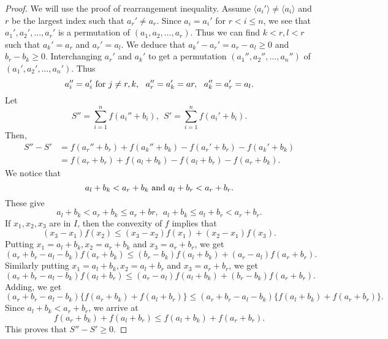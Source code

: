 \begin{proof}
  We will use the proof of rearrangement inequality. Assume $\langle a_i'\rangle \neq\langle a_i\rangle$ and $r$ be the largest
  index such that $a_r'\neq a_r$. Since $a_i=a_i'$ for $r<i\leq n$, we see that $a_1', a_2', \ldots, a_r'$ is a permutation of
  $(a_1, a_2, \ldots, a_r)$. Thus we can find $k<r, l<r$ such that $a_k' = a_r$ and $a_r' = a_l$. We deduce that $a_k' - a_r' = a_r
  - a_l\geq 0$ and $b_r - b_k\geq 0$. Interchanging $a_r'$ and $a_k'$ to get a permutation $(a_1'', a_2'', \ldots, a_n'')$ of $(a_1',
  a_2', \ldots, a_n')$. Thus
  $$a_i''= a_i'\text{~{\rm{for}}~} j\neq r,k,~~a_r''=a_k'=ar,~~a_k''=a_r'=a_l.$$
  Let $$S'' = \sum_{i=1}^nf(a_i'' + b_i),~~S' = \sum_{i=1}^nf(a_i' + b_i).$$
  Then, $$\begin{aligned}S'' - S' & = f(a_r'' + b_r) + f(a_k'' + b_k) - f(a_r' + b_r) - f(a_k' + b_k)\\& = f(a_r + b_r) + f(a_l +
    b_k) - f(a_l + b_r) - f(a_r + b_k).\end{aligned}$$
  We notice that $$a_l + b_k<a_r + b_k\text{~{\rm{and}}~}a_l + b_r < a_r + b_r.$$
  These give $$a_l + b_k < a_r + b_k \leq a_r + br,~~a_l + b_k\leq a_l + b_r < a_r + b_r.$$
  If $x_1, x_2, x_3$ are in $I$, then the convexity of $f$ implies that $$(x_3 - x_1)f(x_2)\leq(x_3 - x_2)f(x_1) + (x_2 -
  x_1)f(x_3).$$
  Putting $x_1 = a_l + b_k, x_2 = a_r + b_k$ and $x_3 = a_r + b_r$, we get
  $$(a_r + b_r - a_l - b_k)f(a_r + b_k)\leq (b_r - b_k)f(a_l + b_k) + (a_r - a_l)f(a_r + b_r).$$
  Similarly putting $x_1 = a_l + b_k, x_2= a_l + b_r$ and $x_3 = a_r + b_r$, we get
  $$(a_r + b_r - a_l -b_k)f(a_l + b_r)\leq(a_r - a_l)f(a_l + b_k) + (b_r - b_k)f(a_r + b_r).$$
  Adding, we get
  $$(a_r + b_r - a_l - b_k)\{f(a_r + b_k) + f(a_l + b_r)\}\leq (a_r + b_r - a_l - b_k)\{f(a_l + b_k) + f(a_r + b_r)\}.$$
  Since $a_l + b_k < a_r + b_r$, we arrive at
  $$f(a_r + b_k) + f(a_l + b_r)\leq f(a_l + b_k) + f(a_r + b_r).$$
  This proves that $S'' - S' \geq 0$.


\end{proof}
